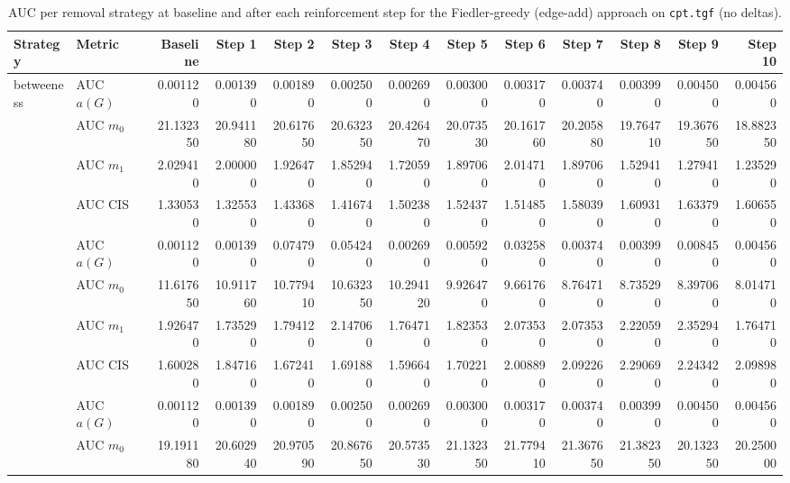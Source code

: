 \begin{table}[htbp]
  \centering
  \caption{AUC per removal strategy at baseline and after each reinforcement step for the Fiedler-greedy (edge-add) approach on \texttt{cpt.tgf} (no deltas).}
  \label{tab:cpt-fiedler_greedy-auc}
\setlength{\tabcolsep}{2.5pt}
  \begin{tabular}{llrrrrrrrrrrr}
    \toprule
    \textbf{Strategy} & \textbf{Metric} & \textbf{Baseline} & \textbf{Step 1} & \textbf{Step 2} & \textbf{Step 3} & \textbf{Step 4} & \textbf{Step 5} & \textbf{Step 6} & \textbf{Step 7} & \textbf{Step 8} & \textbf{Step 9} & \textbf{Step 10} \\
    \midrule
    \multirow{4}{*}{betweeness} & AUC $a(G)$ & 0.001120 & 0.001390 & 0.001890 & 0.002500 & 0.002690 & 0.003000 & 0.003170 & 0.003740 & 0.003990 & 0.004500 & 0.004560 \\
    & AUC $m_0$ & 21.132350 & 20.941180 & 20.617650 & 20.632350 & 20.426470 & 20.073530 & 20.161760 & 20.205880 & 19.764710 & 19.367650 & 18.882350 \\
    & AUC $m_1$ & 2.029410 & 2.000000 & 1.926470 & 1.852940 & 1.720590 & 1.897060 & 2.014710 & 1.897060 & 1.529410 & 1.279410 & 1.235290 \\
    & AUC CIS & 1.330530 & 1.325530 & 1.433680 & 1.416740 & 1.502380 & 1.524370 & 1.514850 & 1.580390 & 1.609310 & 1.633790 & 1.606550 \\
    \addlinespace
    \multirow{4}{*}{closeness} & AUC $a(G)$ & 0.001120 & 0.001390 & 0.074790 & 0.054240 & 0.002690 & 0.005920 & 0.032580 & 0.003740 & 0.003990 & 0.008450 & 0.004560 \\
    & AUC $m_0$ & 11.617650 & 10.911760 & 10.779410 & 10.632350 & 10.294120 & 9.926470 & 9.661760 & 8.764710 & 8.735290 & 8.397060 & 8.014710 \\
    & AUC $m_1$ & 1.926470 & 1.735290 & 1.794120 & 2.147060 & 1.764710 & 1.823530 & 2.073530 & 2.073530 & 2.220590 & 2.352940 & 1.764710 \\
    & AUC CIS & 1.600280 & 1.847160 & 1.672410 & 1.691880 & 1.596640 & 1.702210 & 2.008890 & 2.092260 & 2.290690 & 2.243420 & 2.098980 \\
    \addlinespace
    \multirow{4}{*}{core influence} & AUC $a(G)$ & 0.001120 & 0.001390 & 0.001890 & 0.002500 & 0.002690 & 0.003000 & 0.003170 & 0.003740 & 0.003990 & 0.004500 & 0.004560 \\
    & AUC $m_0$ & 19.191180 & 20.602940 & 20.970590 & 20.867650 & 20.573530 & 21.132350 & 21.779410 & 21.367650 & 21.382350 & 20.132350 & 20.250000 \\

\end{tabular}
\end{table}
